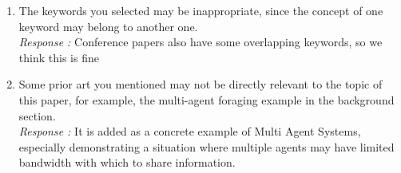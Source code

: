 \begin{enumerate}
\item The keywords you selected may be inappropriate, since the concept of one keyword may belong to another one.\\
{\it Response : }Conference papers also have some overlapping keywords, so we think this is fine

\item Some prior art you mentioned may not be directly relevant to the topic of this paper, for example, the multi-agent foraging example in the background section.\\
{\it Response : }It is added as a concrete example of Multi Agent Systems, especially demonstrating a situation where multiple agents may have limited bandwidth with which to share information.
\end{enumerate}
